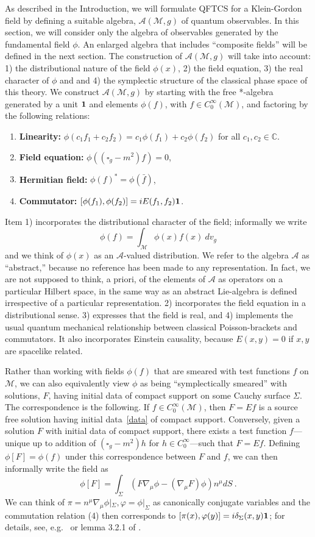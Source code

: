 \documentclass[12pt]{article}
\newcommand{\eA}{\mathscr{A}}
\newcommand{\M}{\mathscr{M}}
\newcommand{\myid}{{\bf 1}}
\newcommand{\mc}{\mathbb{C}}
\theoremstyle{plain}
\theoremstyle{definition}
\def\ben{\begin{equation}}
\def\een{\end{equation}}
\begin{document}
As described in the Introduction, we will formulate QFTCS for a Klein-Gordon field
by defining a suitable algebra, $\eA(\M,g)$ of quantum observables. In this section, we will consider
only the algebra of observables generated by the fundamental field $\phi$. An enlarged algebra that includes ``composite fields'' will be defined in the next section.
The construction of $\eA(\M,g)$ will take into account: 1)
the distributional nature of the field $\phi(x)$, 2) the field equation, 3)
the real character of $\phi$ and
and 4) the symplectic structure of the classical phase space of this
theory. We construct $\eA(\M,g)$ by starting with the free *-algebra
generated by a unit $\myid$ and
elements $\phi(f)$, with $f \in C^\infty_0(\M)$, and factoring by the following relations:
\begin{enumerate}
\item
{\bf Linearity:} $\phi(c_1f_1 + c_2 f_2) = c_1 \phi(f_1) + c_2
\phi(f_2)$ for all $c_1,c_2 \in \mc$.
\item
{\bf Field equation:} $\phi((\square_g - m^2)f) = 0$,
\item
{\bf Hermitian field:} $\phi(f)^* = \phi(\bar f)$,
\item
{\bf Commutator:} $[\phi(f_1), \phi(f_2)] = iE(f_1,f_2) \myid$.
\end{enumerate}
Item 1) incorporates the distributional character of the field; informally
we write
\ben
\phi(f) = \int_\M \phi(x) f(x) \ dv_g
\een
and we think of $\phi(x)$ as an $\eA$-valued distribution.
We refer to the algebra $\eA$ as ``abstract,'' because no
reference has been made to any representation. In fact, we are not
supposed to think, a priori, of the elements of $\eA$ as
operators on a particular Hilbert space, in the same way as an
abstract Lie-algebra is defined irrespective of a particular
representation. 2) incorporates the field equation in a distributional sense.
3) expresses that the field is real, and 4) implements the usual quantum mechanical relationship
between classical Poisson-brackets and commutators. It also incorporates
Einstein causality, because $E(x,y) = 0$ if $x,y$ are spacelike related.

Rather than working with fields $\phi(f)$ that are smeared with test functions
$f$ on $\M$, we can also equivalently view $\phi$ as being ``symplectically smeared'' with solutions, $F$, having initial
data of compact support on some Cauchy surface $\Sigma$. The correspondence
is the following. If $f \in C^\infty_0(\M)$, then $F=Ef$ is a source free solution having
initial data~\eqref{data} of compact support. Conversely, given a solution $F$ with initial
data of compact support, there exists a test function $f$---unique up to addition of $(\square_g - m^2) h$ for $h \in C^\infty_0$---such
that $F = Ef$. Defining $\phi[F] = \phi(f)$ under this correspondence between $F$ and $f$, we can then informally write the
field as
\ben\label{KGip}
\phi[F] = \int_\Sigma (F \nabla_\mu \phi - (\nabla_\mu F) \phi )n^\mu dS \ .
\een
We can think of $\pi = n^\mu \nabla_\mu \phi |_\Sigma, \varphi = \phi |_\Sigma$
as canonically conjugate variables and the commutation relation (4) then
corresponds to $[\pi(x), \varphi(y)] = i\delta_\Sigma(x,y) \myid$;
for details, see, e.g.~\cite{dimock} or lemma 3.2.1 of \cite{wald2}.
\end{document}
